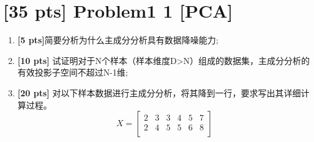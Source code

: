 \documentclass[a4paper,UTF8]{article}
\theoremstyle{definition}
\begin{document}
\newpage

\section*{\textbf{[35 pts]} Problem1 1 [PCA]}

\begin{enumerate}[(1)]\item \textbf{[5 pts]}简要分析为什么主成分分析具有数据降噪能力;
	\item \textbf{[10 pts]} 试证明对于N个样本（样本维度D>N）组成的数据集，主成分分析的有效投影子空间不超过N-1维;
	\item \textbf{[20 pts]} 对以下样本数据进行主成分分析，将其降到一行，要求写出其详细计算过程。
\begin{equation}
	X=
 \left[
 \begin{array}{cccccc}
     2 & 3 & 3 &4 &5 &7 \\
    2 &4 &5 &5 &6 &8 \\
 \end{array}
 \right]        
 \end{equation}
		
\end{enumerate}
\end{document}
